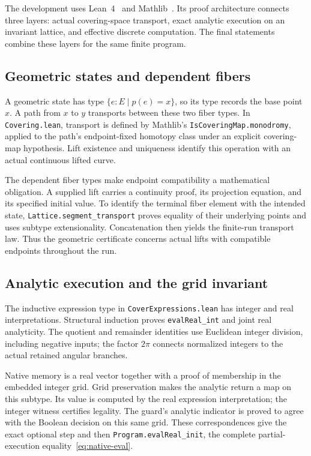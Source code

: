 \documentclass[11pt]{article}
\numberwithin{equation}{section}
\theoremstyle{definition}
\theoremstyle{remark}
\newcommand{\code}[1]{\nolinkurl{#1}}
\begin{document}
The development uses Lean~4~\cite{demouraUllrich2021} and
Mathlib~\cite{mathlib2020}. Its proof architecture connects three
layers: actual covering-space transport, exact analytic execution on
an invariant lattice, and effective discrete computation. The final
statements combine these layers for the same finite program.

\subsection{Geometric states and dependent fibers}

A geometric state has type $\{e:E\mid p(e)=x\}$, so its type records
the base point $x$. A path from $x$ to $y$ transports between these
two fiber types. In \code{Covering.lean}, transport is defined by
Mathlib's \code{IsCoveringMap.monodromy}, applied to the path's
endpoint-fixed homotopy class under an explicit covering-map hypothesis.
Lift existence and uniqueness identify this operation with an actual
continuous lifted curve.

The dependent fiber types make endpoint compatibility a mathematical
obligation. A supplied lift carries a continuity proof, its projection
equation, and its specified initial value. To identify the terminal
fiber element with the intended state, \code{Lattice.segment_transport}
proves equality of their underlying points and uses subtype
extensionality. Concatenation then yields the finite-run transport law.
Thus the geometric certificate concerns actual lifts with compatible
endpoints throughout the run.

\subsection{Analytic execution and the grid invariant}

The inductive expression type in \code{CoverExpressions.lean} has
integer and real interpretations. Structural induction proves
\code{evalReal_int} and joint real analyticity. The quotient and
remainder identities use Euclidean integer division, including negative
inputs; the factor $2\pi$ connects normalized integers to the actual
retained angular branches.

Native memory is a real vector together with a proof of membership in
the embedded integer grid. Grid preservation makes the analytic return
a map on this subtype. Its value is computed by the real expression
interpretation; the integer witness certifies legality. The guard's
analytic indicator is proved to agree with the Boolean decision on
this same grid. These correspondences give the exact optional step
and then \code{Program.evalReal_init}, the complete partial-execution
equality~\eqref{eq:native-eval}.
\end{document}
